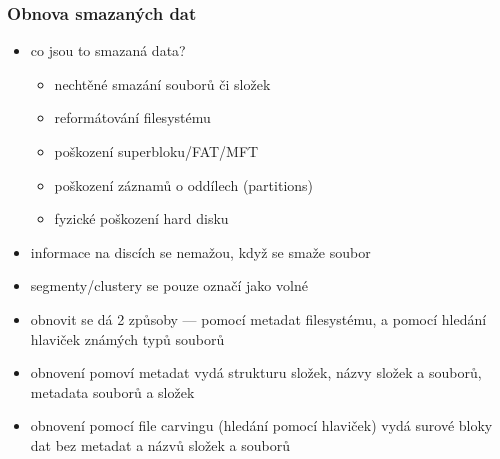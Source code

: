 \subsubsection*{Obnova smazaných dat}
\begin{itemize}
	\item co jsou to smazaná data?
	\begin{itemize}
		\item nechtěné smazání souborů či složek
		\item reformátování filesystému
		\item poškození superbloku/FAT/MFT
		\item poškození záznamů o oddílech (partitions)
		\item fyzické poškození hard disku
	\end{itemize}
	\item informace na discích se nemažou, když se smaže soubor
	\item segmenty/clustery se pouze označí jako volné
	\item obnovit se dá 2 způsoby --- pomocí metadat filesystému, a pomocí hledání hlaviček známých typů souborů
	\item obnovení pomoví metadat vydá strukturu složek, názvy složek a souborů, metadata souborů a složek
	\item obnovení pomocí file carvingu (hledání pomocí hlaviček) vydá surové bloky dat bez metadat a názvů složek a souborů
\end{itemize}